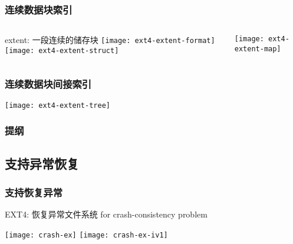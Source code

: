 \begin{frame}[fragile]
	\frametitle{连续数据块索引}
	\begin{columns}
	\begin{column}{.4\textwidth}
		
	extent: 一段连续的储存块
\centering
\texttt{[image: ext4-extent-format]}
\texttt{[image: ext4-extent-struct]}
		
	\end{column}
	
		\begin{column}{.6\textwidth}			

	\texttt{[image: ext4-extent-map]}

	
\end{column}
\end{columns}

\end{frame}


\begin{frame}[fragile]
	\frametitle{连续数据块间接索引}
	\centering
	\texttt{[image: ext4-extent-tree]}

\end{frame}




\begin{frame}
\frametitle{提纲} %
\tableofcontents %
\end{frame}
\subsection{支持异常恢复}
\begin{frame}[fragile]
	\frametitle{支持恢复异常}
	EXT4: 恢复异常文件系统 for crash-consistency problem
	
	\centering
	\texttt{[image: crash-ex]}
	\texttt{[image: crash-ex-iv1]}
\end{frame}


